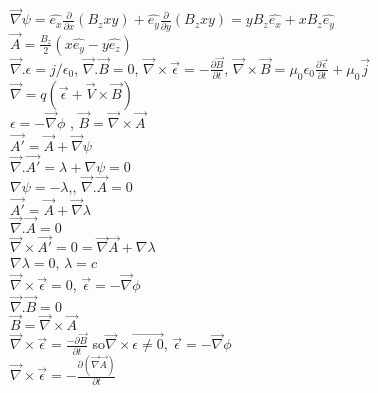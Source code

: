 \documentclass{article}
\begin{document}
$\vec{\nabla}\psi=\hat{e_{x}}\frac{\partial}{\partial x}(B_{z}xy)+\hat{e_{y}}\frac{\partial}{\partial y}(B_{z}xy)=yB_{z}\hat{e_{x}}+xB_{z}\hat{e_{y}}$\\

$\vec{A}=\frac{B_{z}}{2}(x\hat{e_{y}}-y\hat{e_{z}})$\\

$\vec{\nabla}.\epsilon=j/\epsilon_{0}$, $\vec{\nabla}.\vec{B}=0$, $\vec{\nabla}\times\vec{\epsilon}=-\frac{\partial\vec{B}}{\partial t}$, $\vec{\nabla}\times
\vec{B}=\mu_{0}\epsilon_{0}\frac{\partial \vec{\epsilon}}{\partial t}+\mu_{0}\vec{j}$\\

$\vec{\nabla}=q(\vec{\epsilon}+\vec{V}\times\vec{B})$\\

$\epsilon=-\vec{\nabla}\phi$ , \hspace{1cm} $\vec{B}=\vec{\nabla}\times\vec{A}$\\

$\vec{A'}= \vec{A}+\vec{\nabla}\psi$\\

$\vec{\nabla}.\vec{A'}=\lambda+\nabla \psi=0$\\

$\nabla\psi=-\lambda$,\hspace{1cm}, $\vec{\nabla}.\vec{A}=0$\\

$\vec{A'}=\vec{A}+\vec{\nabla}\lambda$\\
$\vec{\nabla}.\vec{A}=0$\\
$\vec{\nabla}\times \vec{A'}=0=\vec{\nabla}\vec{A}+\nabla\lambda$\\

 $\nabla \lambda=0$\hspace{1cm}, $\lambda=c$\\

$\vec{\nabla}\times \vec{\epsilon}=0$, $\vec{\epsilon}=-\vec{\nabla}\phi$\\

$\vec{\nabla}.\vec{B}=0$\\
$\vec{B}=\vec{\nabla}\times\vec{A}
$\\
$\vec{\nabla}\times\vec{\epsilon}=\frac{-\partial\vec{B}}{\partial t}$ \hspace{1cm} so$\vec{\nabla}\times
\vec{\epsilon\neq 0}$, $\vec{\epsilon}=-\vec{\nabla}\phi$\\

$\vec{\nabla}\times \vec{\epsilon}=-\frac{\partial\left(\vec{\nabla}\vec{A}\right)}{\partial t}$\\
\end{document}
